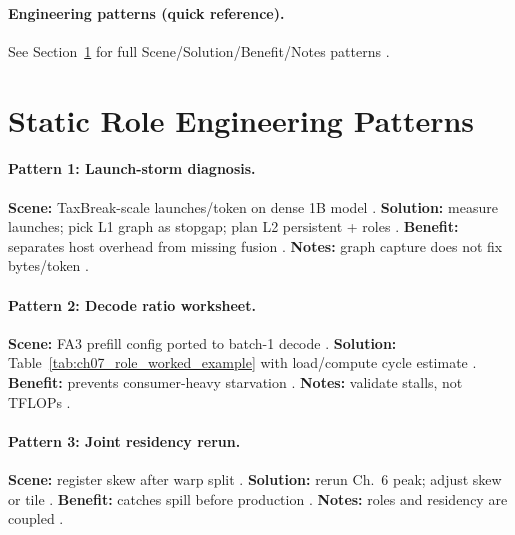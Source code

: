 \paragraph{Engineering patterns (quick reference).}
See Section~\ref{sec:ch07_role_patterns} for full Scene/Solution/Benefit/Notes patterns \citep{yirage2026,chen2020compilerbasedhardw,patel2025llminference}.

\section{Static Role Engineering Patterns}
\label{sec:ch07_role_patterns}

\paragraph{Pattern 1: Launch-storm diagnosis.}
\textbf{Scene:} TaxBreak-scale launches/token on dense 1B model \citep{taxbreak2026}.
\textbf{Solution:} measure launches; pick L1 graph as stopgap; plan L2 persistent + roles \citep{nvidia2024cudagraphs,shah2024flashattention3}.
\textbf{Benefit:} separates host overhead from missing fusion \citep{patel2025llminference,memoryfloor2026}.
\textbf{Notes:} graph capture does not fix bytes/token \citep{dao2022flashattention,yirage2026}.

\paragraph{Pattern 2: Decode ratio worksheet.}
\textbf{Scene:} FA3 prefill config ported to batch-1 decode \citep{shah2024flashattention3,taxbreak2026}.
\textbf{Solution:} Table~\ref{tab:ch07_role_worked_example} with load/compute cycle estimate \citep{patel2025llminference,memoryfloor2026}.
\textbf{Benefit:} prevents consumer-heavy starvation \citep{yirage2026,shah2024flashattention3}.
\textbf{Notes:} validate stalls, not TFLOPs \citep{memoryfloor2026}.

\paragraph{Pattern 3: Joint residency rerun.}
\textbf{Scene:} register skew after warp split \citep{shah2024flashattention3,nvidia2022hopper}.
\textbf{Solution:} rerun Ch.~6 peak; adjust skew or tile \citep{yirage2026,dao2022flashattention,chen2020compilerbasedhardw}.
\textbf{Benefit:} catches spill before production \citep{memoryfloor2026}.
\textbf{Notes:} roles and residency are coupled \citep{wu2024mirage}.

